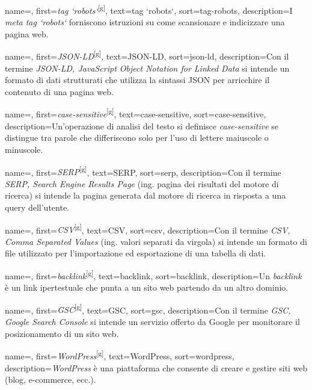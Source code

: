  {
    name=,
    first={\textit{tag `robots`}\textsuperscript{[g]}},
    text=tag `robots`,
    sort=tag-robots,
    description={I \emph{meta tag `robots`} forniscono istruzioni su come scansionare e indicizzare una pagina web.}
}

 {
    name=,
    first={\textit{JSON-LD}\textsuperscript{[g]}},
    text=JSON-LD,
    sort=json-ld,
    description={Con il termine \emph{JSON-LD, JavaScript Object Notation for Linked Data} si intende un formato di dati strutturati che utilizza la sintassi JSON per arricchire il contenuto di una pagina web.}
}

 {
    name=,
    first={\textit{case-sensitive}\textsuperscript{[g]}},
    text=case-sensitive,
    sort=case-sensitive,
    description={Un'operazione di analisi del testo si definisce \emph{case-sensitive} se distingue tra parole che differiscono solo per l'uso di lettere maiuscole o minuscole.}
}

 {
    name=,
    first={\textit{SERP}\textsuperscript{[g]}},
    text=SERP,
    sort=serp,
    description={Con il termine \emph{SERP, Search Engine Results Page} (ing. pagina dei risultati del motore di ricerca) si intende la pagina generata dal motore di ricerca in risposta a una query dell'utente.}
}

 {
    name=,
    first={\textit{CSV}\textsuperscript{[g]}},
    text=CSV,
    sort=csv,
    description={Con il termine \emph{CSV, Comma Separated Values} (ing. valori separati da virgola) si intende un formato di file utilizzato per l'importazione ed esportazione di una tabella di dati.}
}

 {
    name=,
    first={\textit{backlink}\textsuperscript{[g]}},
    text=backlink,
    sort=backlink,
    description={Un \emph{backlink} è un link ipertestuale che punta a un sito web partendo da un altro dominio.}
}

 {
    name=,
    first={\textit{GSC}\textsuperscript{[g]}},
    text=GSC,
    sort=gsc,
    description={Con il termine \emph{GSC, Google Search Console} si intende un servizio offerto da Google per monitorare il posizionamento di un sito web.}
}

 {
    name=,
    first={\textit{WordPress}\textsuperscript{[g]}},
    text=WordPress,
    sort=wordpress,
    description={\emph{WordPress} è una piattaforma che consente di creare e gestire siti web (blog, e-commerce, ecc.).}
}

